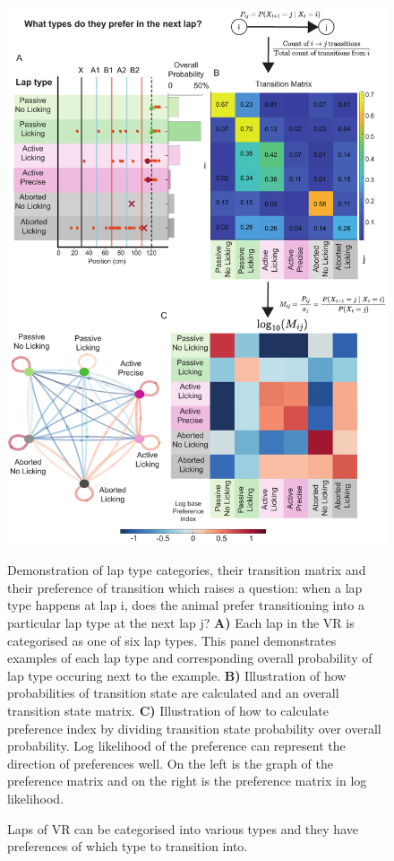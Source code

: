 \begin{figure}
    \centering
    \includegraphics[width=1\linewidth]{figures//Chapter 3 Behaviour//Thesis Figures//figure_PDFs/fig4_transition_matrix.pdf}
    \caption{Laps of VR can be categorised into various types and they have preferences of which type to transition into.}

\medskip
\small
Demonstration of lap type categories, their transition matrix and their preference of transition which raises a question: when a lap type happens at lap i, does the animal prefer transitioning into a particular lap type at the next lap j? \textbf{A)} Each lap in the VR is categorised as one of six lap types. This panel demonstrates examples of each lap type and corresponding overall probability of lap type occuring next to the example. \textbf{B)} Illustration of how probabilities of transition state are calculated and an overall transition state matrix. \textbf{C)} Illustration of how to calculate preference index by dividing transition state probability over overall probability. Log likelihood of the preference can represent the direction of preferences well. On the left is the graph of the preference matrix and on the right is the preference matrix in log likelihood. 
    \label{fig:how to preference matrix}
\end{figure}


